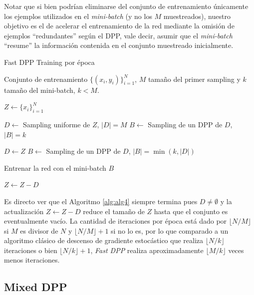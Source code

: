 \vspace{0.2cm}

Notar que si bien podrían eliminarse del conjunto de entrenamiento únicamente los ejemplos utilizados en el \textit{mini-batch} (y no los $M$ muestreados), nuestro objetivo es el de acelerar el entrenamiento de la red mediante la omisión de ejemplos ``redundantes'' según el DPP, vale decir, asumir que el \textit{mini-batch} ``resume'' la información contenida en el conjunto muestreado inicialmente.

\begin{algorithm}
\caption{Fast DPP Training por época} \label{alg:alg4}
\begin{algorithmic}
\Require Conjunto de entrenamiento $\{ (x_i,y_i) \}_{i=1}^N$, $M$ tamaño del primer sampling y $k$ tamaño del mini-batch, $k < M$.  

\State $Z \gets \{x_i\}_{i=1}^N$


\State $D \gets$ Sampling uniforme de $Z$, $|D| = M$
\State $B \gets$ Sampling de un DPP de $D$, $|B| = k$ 

\Else

\State $D \gets Z$
\State $B \gets$ Sampling de un DPP de $D$, $|B| = \min(k, |D|)$ 

\EndIf

\State Entrenar la red con el mini-batch $B$

\State $Z \gets Z - D$

\EndWhile   
\end{algorithmic}
\end{algorithm}

Es directo ver que el Algoritmo \ref{alg:alg4} siempre termina pues $D \neq \emptyset$ y la actualización $Z \gets Z - D$ reduce el tamaño de $Z$ hasta que el conjunto es eventualmente vacío. La cantidad de iteraciones por época está dado por $\lfloor N / M \rfloor$ si $M$ es divisor de $N$ y $\lfloor N / M \rfloor + 1$ si no lo es, por lo que comparado a un algoritmo clásico de descenso de gradiente estocástico que realiza $\lfloor N / k \rfloor$ iteraciones o bien $\lfloor N / k \rfloor + 1$, \textit{Fast DPP} realiza aproximadamente $\lfloor M / k \rfloor$ veces menos iteraciones.


\subsection{Mixed DPP}\label{section:mixed_dpp}

